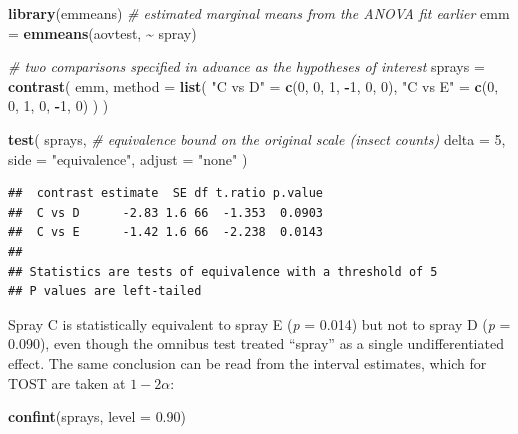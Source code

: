 \documentclass[]{interact}
\theoremstyle{plain}%
\theoremstyle{definition}
\theoremstyle{remark}
\newenvironment{Shaded}{\begin{snugshade}}{\end{snugshade}}
\newcommand{\AttributeTok}[1]{\textcolor[rgb]{0.13,0.29,0.53}{#1}}
\newcommand{\CommentTok}[1]{\textcolor[rgb]{0.56,0.35,0.01}{\textit{#1}}}
\newcommand{\DecValTok}[1]{\textcolor[rgb]{0.00,0.00,0.81}{#1}}
\newcommand{\FloatTok}[1]{\textcolor[rgb]{0.00,0.00,0.81}{#1}}
\newcommand{\FunctionTok}[1]{\textcolor[rgb]{0.13,0.29,0.53}{\textbf{#1}}}
\newcommand{\NormalTok}[1]{#1}
\newcommand{\OtherTok}[1]{\textcolor[rgb]{0.56,0.35,0.01}{#1}}
\newcommand{\SpecialCharTok}[1]{\textcolor[rgb]{0.81,0.36,0.00}{\textbf{#1}}}
\newcommand{\StringTok}[1]{\textcolor[rgb]{0.31,0.60,0.02}{#1}}
\begin{document}
\begin{Shaded}
\begin{Highlighting}[]
\FunctionTok{library}\NormalTok{(emmeans)}
\CommentTok{\# estimated marginal means from the ANOVA fit earlier}
\NormalTok{emm }\OtherTok{=} \FunctionTok{emmeans}\NormalTok{(aovtest, }\SpecialCharTok{\textasciitilde{}}\NormalTok{ spray)}

\CommentTok{\# two comparisons specified in advance as the hypotheses of interest}
\NormalTok{sprays }\OtherTok{=} \FunctionTok{contrast}\NormalTok{(}
\NormalTok{  emm,}
  \AttributeTok{method =} \FunctionTok{list}\NormalTok{(}
    \StringTok{"C vs D"} \OtherTok{=} \FunctionTok{c}\NormalTok{(}\DecValTok{0}\NormalTok{, }\DecValTok{0}\NormalTok{, }\DecValTok{1}\NormalTok{, }\SpecialCharTok{{-}}\DecValTok{1}\NormalTok{, }\DecValTok{0}\NormalTok{, }\DecValTok{0}\NormalTok{),}
    \StringTok{"C vs E"} \OtherTok{=} \FunctionTok{c}\NormalTok{(}\DecValTok{0}\NormalTok{, }\DecValTok{0}\NormalTok{, }\DecValTok{1}\NormalTok{, }\DecValTok{0}\NormalTok{, }\SpecialCharTok{{-}}\DecValTok{1}\NormalTok{, }\DecValTok{0}\NormalTok{)}
\NormalTok{  )}
\NormalTok{)}

\FunctionTok{test}\NormalTok{(}
\NormalTok{  sprays,}
  \CommentTok{\# equivalence bound on the original scale (insect counts)}
  \AttributeTok{delta =} \DecValTok{5}\NormalTok{,}
  \AttributeTok{side =} \StringTok{"equivalence"}\NormalTok{,}
  \AttributeTok{adjust =} \StringTok{"none"}
\NormalTok{)}
\end{Highlighting}
\end{Shaded}

\begin{verbatim}
##  contrast estimate  SE df t.ratio p.value
##  C vs D      -2.83 1.6 66  -1.353  0.0903
##  C vs E      -1.42 1.6 66  -2.238  0.0143
## 
## Statistics are tests of equivalence with a threshold of 5 
## P values are left-tailed
\end{verbatim}

Spray C is statistically equivalent to spray E (\emph{p} = 0.014) but
not to spray D (\emph{p} = 0.090), even though the omnibus test treated
``spray'' as a single undifferentiated effect. The same conclusion can
be read from the interval estimates, which for TOST are taken at
\(1-2\alpha\):

\begin{Shaded}
\begin{Highlighting}[]
\FunctionTok{confint}\NormalTok{(sprays, }\AttributeTok{level =} \FloatTok{0.90}\NormalTok{)}
\end{Highlighting}
\end{Shaded}
\end{document}
